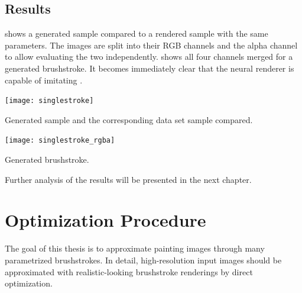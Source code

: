 \subsection{Results}
 shows a generated sample compared to a rendered sample with the same parameters.
The images are split into their RGB channels and the alpha channel to allow evaluating the two independently.
 shows all four channels merged for a generated brushstroke.
It becomes immediately clear that the neural renderer is capable of imitating .
\begin{marginfigure}
    \texttt{[image: singlestroke]}
    \caption[]{Generated sample and the corresponding data set sample compared.}
\end{marginfigure}
\begin{marginfigure}
    \texttt{[image: singlestroke\_rgba]}
    \caption[]{Generated brushstroke.}
\end{marginfigure}

Further analysis of the results will be presented in the next chapter.


\section{Optimization Procedure}
The goal of this thesis is to approximate painting images through many parametrized brushstrokes.
In detail, high-resolution input images should be approximated with realistic-looking brushstroke renderings by direct optimization.

